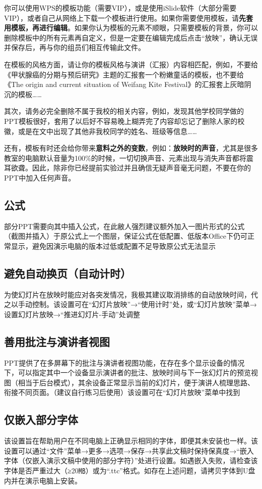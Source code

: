 你可以使用WPS的模板功能（需要VIP），或是使用iSlide软件（大部分需要VIP），或者自己从网络上下载一个模板进行使用。如果你需要使用模板，请\textbf{先套用模板，再进行编辑}。如果你认为模板的元素不顺眼，只需要模板的背景，你可以删除模板中的所有元素再自定义，但是一定要在编辑完成后点击“放映”，确认无误并保存后，再与你的组员们相互传输此文件。

在模板的风格方面，请让你的模板风格与演讲（汇报）内容相匹配，例如，不要给《甲状腺癌的分期与预后研究》主题的汇报套一个粉嫩童话的模板，也不要给《The origin and current situation of Weifang Kite Festival》的汇报套上灰暗阴沉的模板……

其次，请务必完全删除不属于我校的相关内容，例如，发现其他学校同学做的PPT模板很好，套用了以后好不容易晚上糊弄完了内容却忘记了删除人家的校徽，或是在文中出现了其他非我校同学的姓名、班级等信息……

还有，模板有时还会给你带来\textbf{意料之外的变数}，例如：\textbf{放映时的声音}，尤其是很多教室的电脑默认音量为100\%的时候，一切切换声音、元素出现与消失声音都将震耳欲聋。因此，除非你已经提前实验过并且确信无疑声音毫无问题，不要在你的PPT中加入任何声音。

\subsection[公式]{公式}
部分PPT需要向其中插入公式，在此敝人强烈建议额外加入一图片形式的公式（截图并插入）于原公式上一个图层，保证公式在低配置、低版本Office下仍可正常显示，避免因演示电脑的版本过低或配置不足导致原公式无法显示

\subsection[避免自动换页（自动计时）]{避免自动换页（自动计时）}
为使幻灯片在放映时能应对各突发情况，我极其建议取消排练的自动放映时间，代之以手动控制。该设置可在“幻灯片放映”→“使用计时”处，或“幻灯片放映”菜单→设置幻灯片放映→“推进幻灯片-手动”处调整

\subsection[善用批注与演讲者视图]{善用批注与演讲者视图}
PPT提供了在多屏幕下的批注与演讲者视图功能，在存在多个显示设备的情况下，可以指定其中一个设备显示演讲者的批注、放映时间与下一张幻灯片的预览视图（相当于后台模式），其余设备正常显示当前的幻灯片，便于演讲人梳理思路、衔接不同页面。（建议自行练习后使用）该设置可在“幻灯片放映”菜单中找到

\subsection[仅嵌入部分字体]{仅嵌入部分字体}
该设置旨在帮助用户在不同电脑上正确显示相同的字体，即便其未安装也一样。该设置可以通过“文件”菜单→更多→选项→保存→共享此文稿时保持保真度→“嵌入字体（仅嵌入演示文稿中使用的部分字符）”处进行设置。如遇嵌入失败，请检查该字体是否严重过大（≥20㎆）或为“.ttc”格式。如存在上述问题，请拷贝字体到U盘内并在演示电脑上安装。

